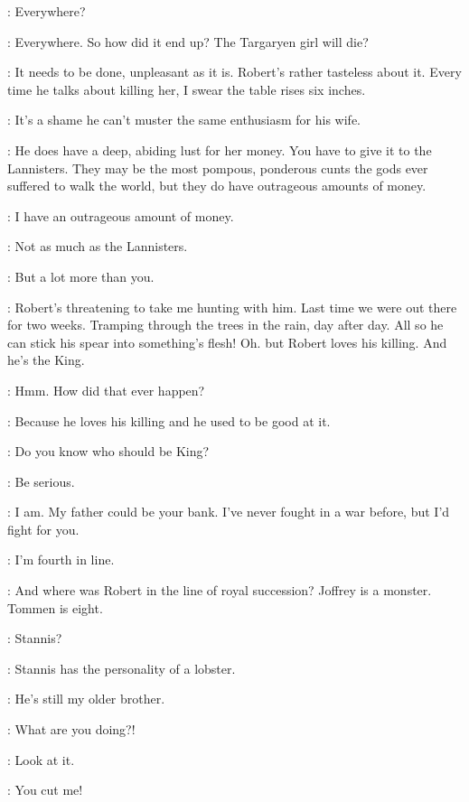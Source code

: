 
\RENLY: Everywhere? 

\LORAS: Everywhere. So how did it end up? The Targaryen girl will die? 

\RENLY: It needs to be done, unpleasant as it is. Robert's rather tasteless about it. Every time he talks about killing her, I swear the table rises six inches. 

\LORAS: It's a shame he can't muster the same enthusiasm for his wife. 

\RENLY: He does have a deep, abiding lust for her money. You have to give it to the Lannisters. They may be the most pompous, ponderous cunts the gods ever suffered to walk the world, but they do have outrageous amounts of money. 

\LORAS: I have an outrageous amount of money. 

\RENLY: Not as much as the Lannisters. 

\LORAS: But a lot more than you. 

\RENLY: Robert's threatening to take me hunting with him. Last time we were out there for two weeks.  Tramping through the trees in the rain, day after day. All so he can stick his spear into something's flesh! Oh. but Robert loves his killing. And he's the King. 

\LORAS: Hmm.  How did that ever happen? 

\RENLY: Because he loves his killing and he used to be good at it. 

\LORAS: Do you know who should be King? 

\RENLY: Be serious. 

\LORAS: I am. My father could be your bank. I've never fought in a war before, but I'd fight for you. 

\RENLY: I'm fourth in line. 

\LORAS: And where was Robert in the line of royal succession? Joffrey is a monster. Tommen is eight. 

\RENLY: Stannis? 

\LORAS: Stannis has the personality of a lobster. 

\RENLY: He's still my older brother. 


\RENLY: What are you doing?! 

\LORAS: Look at it. 

\RENLY: You cut me! 

